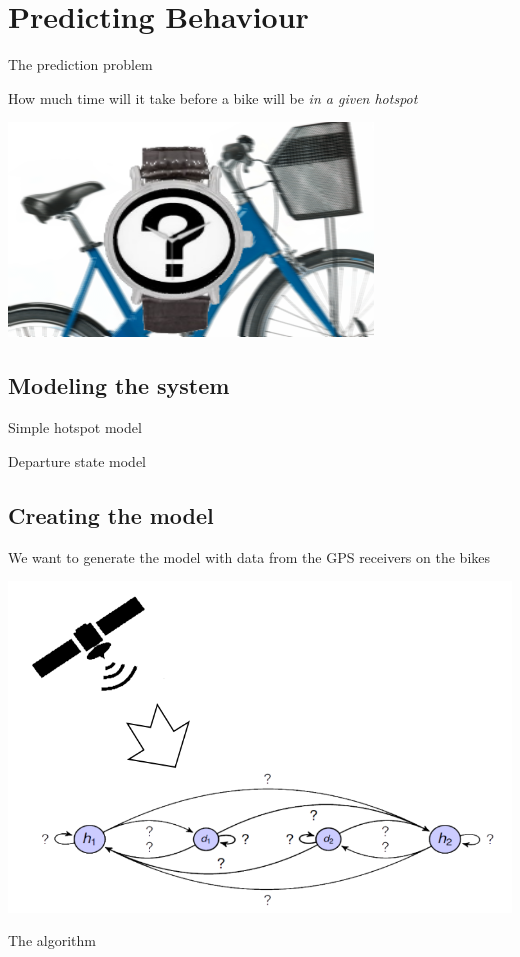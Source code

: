 \section{Predicting Behaviour}
\begin{frame}{The prediction problem}
\begin{center}
How much time will it take before a bike will be \emph{in a given hotspot}

\includegraphics[width=0.8\linewidth]{graphics/biketime}
\end{center}

\end{frame}

\subsection{Modeling the system}

\begin{frame}{Simple hotspot model}

\end{frame}

\begin{frame}{Departure state model}

\end{frame}

\subsection{Creating the model}

\begin{frame}{}
	
\begin{center}
We want to generate the model with data from the GPS receivers on the bikes
	
\includegraphics[width=0.8\linewidth]{graphics/build_the_model}
\end{center}

\end{frame}

\begin{frame}{The algorithm}

\end{frame}